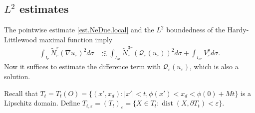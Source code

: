 \documentclass[reqno,12pt]{amsart} %
\theoremstyle{definition}
\theoremstyle{remark}
\numberwithin{equation}{section}
\newcommand{\Q}{\mathcal{Q}}
\newcommand{\e}{\varepsilon}
\DeclareMathOperator{\dist}{dist}
\begin{document}
\subsection{$L^2$ estimates}\label{subsec.L2}


The pointwise estimate \eqref{est.NeDue.local} and the $L^2$ boundedness of the Hardy-Littlewood maximal function imply
\begin{equation}\label{est.NeDue.RN}
\begin{aligned}
    \int_{I_{r}} \widetilde{N}_\e^{r}(\nabla u_\e)^2 d\sigma & \lesssim \int_{I_{3r}} \widetilde{N}_\e^{3r} (\Q_\e(u_\e))^2 d\sigma + \int_{I_{3r}} V_\e^2 d\sigma. 
    \end{aligned}
\end{equation}
Now it suffices to estimate the difference term with $\Q_\e(u_\e)$, which is also a solution.


Recall that $T_t = T_t(O) = \{ (x',x_d): |x'|<t, \phi(x') < x_d < \phi(0) + Mt \}$ is a Lipschitz domain.
Define $T_{t,\e} = (T_t)_\e = \{ X \in T_t: \dist(X, \partial T_t) < \e \}$.
\end{document}
